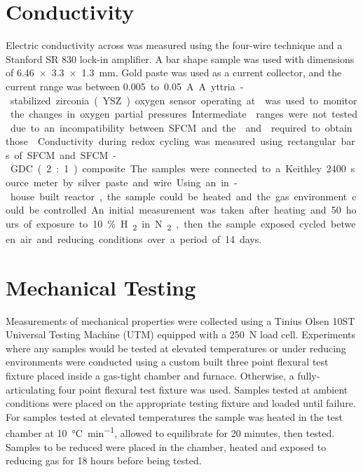 \section{Conductivity}
    Electric conductivity across  was measured using the four-wire technique and a Stanford SR 830 lock-in amplifier.
    A bar shape sample was used with dimensions of \SI{6.46x3.3x1.3}{\milli\meter}.
    Gold paste was used as a current collector, and the current range was between \SI{0.005} to \SI{0.05}{A}.
    A yttria-stabilized zirconia (YSZ) oxygen sensor operating at  was used to monitor the changes in oxygen partial pressures.
    Intermediate  ranges were not tested due to an incompatibility between SFCM and the  and  required to obtain those .

    Conductivity during redox cycling was measured using rectangular bars of SFCM and SFCM-GDC (2:1) composite.
    The samples were connected to a Keithley 2400 source meter by silver paste and wire.
    Using an in-house built reactor, the sample could be heated and the gas environment could be controlled.
    An initial measurement was taken after heating and 50 hours of exposure to 10\% H\textsubscript{2} in N\textsubscript{2}, then the sample exposed cycled between air and reducing conditions over a period of 14 days.

\section{Mechanical Testing}
    Measurements of mechanical properties were collected using a Tinius Olsen 10ST Universal Testing Machine (UTM) equipped with a \SI{250}{N} load cell.
    Experiments where any samples would be tested at elevated temperatures or under reducing environments were conducted using a custom built three point flexural test fixture placed inside a gas-tight chamber and furnace.
    Otherwise, a fully-articulating four point flexural test fixture was used.
    Samples tested at ambient conditions were placed on the appropriate testing fixture and loaded until failure.
    For samples tested at elevated temperatures the sample was heated in the test chamber at \SI{10}{\celsius\per\minute}, allowed to equilibrate for 20 minutes, then tested.
    Samples to be reduced were placed in the chamber, heated and exposed to reducing gas for 18 hours before being tested.

